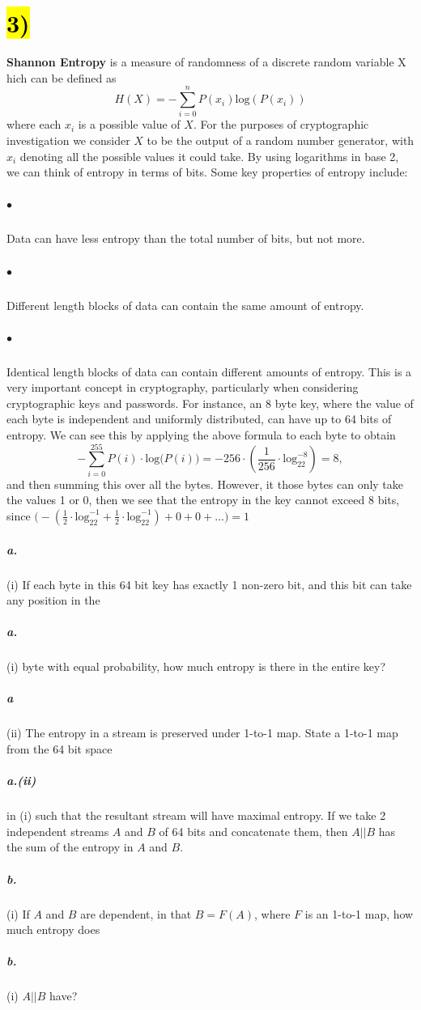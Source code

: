 \documentclass[11pt]{article}
\newcommand{\pnewline}[1]{\vspace*{-\baselineskip}\subparagraph*{{\color{white} #1}}}
\newcommand{\newnew}{\newline\newline}
\begin{document}
{\section*{\hl{3)}} \textbf{Shannon Entropy} is a measure of randomness of a discrete random variable X hich can be defined as
$$H(X) = -\sum^{n}_{i = 0}P(x_i)\text{log}(P(x_i))$$
where each $x_i$ is a possible value of $X$.\newline\newline
For the purposes of cryptographic investigation we consider $X$ to be the output of a random number generator, with $x_i$ denoting all the possible values it could take. By using logarithms in base 2, we can think of entropy in terms of bits. Some key properties of entropy include:
\subparagraph*{$\bullet$} Data can have less entropy than the total number of bits, but not more.
\subparagraph*{$\bullet$} Different length blocks of data can contain the same amount of entropy.
\subparagraph*{$\bullet$} Identical length blocks of data can contain different amounts of entropy.\newline\newline
This is a very important concept in cryptography, particularly when considering cryptographic keys and passwords. For instance, an 8 byte key, where the value of each byte is independent and uniformly distributed, can have up to 64 bits of entropy. We can see this by applying the above formula to each byte to obtain 
$$-\sum_{i = 0}^{255}P(i)\cdot\text{log}\big( P(i) \big) = -256 \cdot (\frac{1}{256}\cdot \text{log}_22^{-8}) = 8,$$
and then summing this over all the bytes. \newnew
However, it those bytes can only take the values 1 or 0, then we see that the entropy in the key cannot exceed 8 bits, since $\big(-(\frac{1}{2}\cdot \text{log}_22^{-1}+\frac{1}{2}\cdot \text{log}_22^{-1}) + 0 + 0 + ...\big) = 1$
\subparagraph*{a.} (i) If each byte in this 64 bit key has exactly 1 non-zero bit, and this bit can take any position in the \pnewline{a.}{\color{white}(i) }byte with equal probability, how much entropy is there in the entire key?
\pnewline{a}(ii) The entropy in a stream is preserved under 1-to-1 map. State a 1-to-1 map from the 64 bit space \pnewline{{a.}(ii)} in (i) such that the resultant stream will have maximal entropy.\newnew
If we take 2 independent streams $A$ and $B$ of 64 bits and concatenate them, then $A||B$ has the sum of the entropy in $A$ and $B$.
\subparagraph*{b.} (i) If $A$ and $B$ are dependent, in that $B = F(A)$, where $F$ is an 1-to-1 map, how much entropy does \pnewline{b.}{\color{white}(i) }$A||B$ have?\newpage
}
\end{document}
